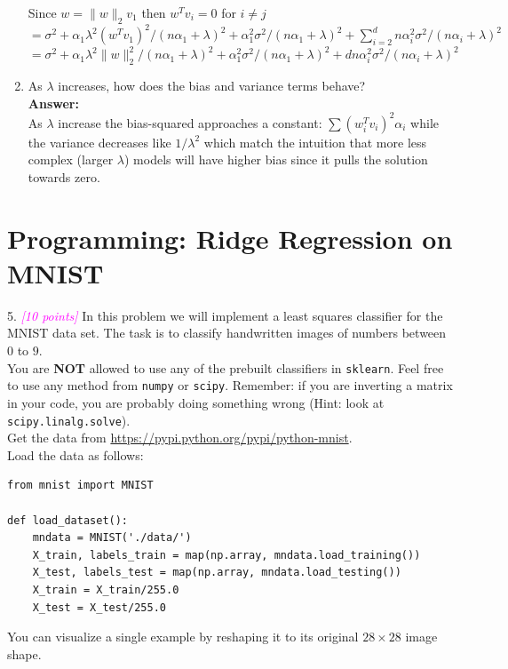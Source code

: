 \documentclass{article}
\newcommand{\1}{\mathbf{1}}
\newcommand{\grade}[1]{\small\textcolor{magenta}{\emph{[#1 points]}} \normalsize}
\begin{document}
\begin{enumerate}
    Since $w=\|w\|_2 v_1$ then $w^T v_i=0$ for $i\neq j$\\
    $=\sigma^2 +\alpha_1 \lambda^2 (w^T v_1)^2 /(n\alpha_1 + \lambda) ^2 + \alpha_1^2 \sigma^2 /(n\alpha_1 + \lambda)^2 +\sum_{i=2}^d n \alpha_i^2 \sigma^2 /(n\alpha_i + \lambda)^2$\\
    $=\sigma^2 +\alpha_1 \lambda^2 \|w\|_2^2 /(n\alpha_1 + \lambda) ^2 + \alpha_1^2 \sigma^2 /(n\alpha_1 + \lambda)^2 +d n \alpha_i^2 \sigma^2 /(n\alpha_i + \lambda)^2$\\
    
    \item As $\lambda$ increases, how does the bias and variance terms behave?\\
    
     \textbf{Answer:}\\
     
     As $\lambda$ increase the bias-squared approaches a constant: $\sum (w_i^T v_i)^2 \alpha_i$ while the variance decreases like $1/\lambda^2$ which match the intuition that more less complex (larger $\lambda$) models will have higher bias since it pulls the solution towards zero.
     
\end{enumerate}


\section{Programming: Ridge Regression on MNIST}
5. \grade{10} In this problem we will implement a least squares classifier for the MNIST data set. The task
is to classify handwritten images of numbers between $0$ to $9$.\\

You are \textbf{NOT} allowed to use
any of the prebuilt  classifiers in \verb|sklearn|.  Feel free to use any method from \verb|numpy|
or \verb|scipy|. Remember: if you are inverting a matrix in your code, you are probably doing something wrong (Hint: look at \verb|scipy.linalg.solve|).\\

Get the data from \url{https://pypi.python.org/pypi/python-mnist}. \\
Load the data as follows:
\begin{verbatim}
from mnist import MNIST

def load_dataset():
    mndata = MNIST('./data/')
    X_train, labels_train = map(np.array, mndata.load_training())
    X_test, labels_test = map(np.array, mndata.load_testing())
    X_train = X_train/255.0
    X_test = X_test/255.0
\end{verbatim}
You can visualize a single example by reshaping it to its original $28 \times 28$ image shape.
\end{document}
